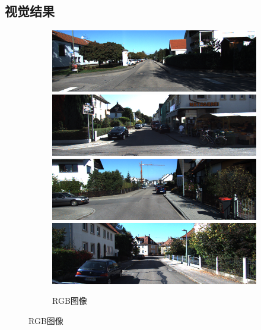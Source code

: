 \subsection{视觉结果}
\begin{figure}[htb]
  \centering
  \begin{subfigure}{0.24\linewidth}
  \begin{minipage}[b]{1\linewidth}
  \includegraphics[width=1\linewidth]{figure/Pixel_cla_kitti/1rgb.png}\vspace{4pt}
  \includegraphics[width=1\linewidth]{figure/Pixel_cla_kitti/2rgb.png}\vspace{4pt}
  \includegraphics[width=1\linewidth]{figure/Pixel_cla_kitti/3rgb.png}\vspace{4pt}
  \includegraphics[width=1\linewidth]{figure/Pixel_cla_kitti/4rgb.png}
  \end{minipage}
  \caption{RGB图像}

\end{subfigure}
\end{figure}
